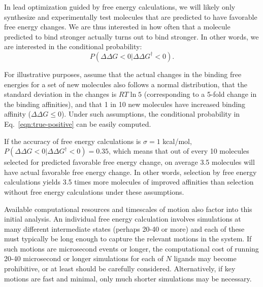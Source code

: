 \documentclass[9pt,bestpractices]{livecoms}
\begin{document}
In lead optimization guided by free energy calculations, we will likely only
synthesize and experimentally test molecules that are predicted to
have favorable free energy changes.  We are thus interested in how
often that a molecule predicted to bind stronger actually turns out to
bind stronger.  In other words, we are interested in the conditional
probability:
\begin{equation}
  P(\Delta\Delta G<0|\Delta\Delta G^\dagger<0).
  \label{eqn:true-positive}
\end{equation}

For illustrative purposes, assume that the actual changes in the
binding free energies for a set of new molecules also follows a normal
distribution, that the standard deviation in the changes is $RT\ln 5$
(corresponding to a 5-fold change in the binding affinities), and that
1 in 10 new molecules have increased binding affinity ($\Delta\Delta G
\leq 0$).  Under such assumptions, the conditional probability in
Eq.~\ref{eqn:true-positive} can be easily computed. 

If the accuracy
of free energy calculations is $\sigma = 1$ kcal/mol, $P(\Delta\Delta
G<0|\Delta\Delta G^\dagger<0) = 0.35$, which means that out of every
10 molecules selected for predicted favorable free energy change, on
average 3.5 molecules will have actual favorable free energy change.
In other words, selection by free energy calculations yields 3.5 times
more molecules of improved affinities than selection without free
energy calculations under these assumptions.
  
Available computational resources and timescales of motion also factor
into this initial analysis. An individual free energy calculation
involves simulations at many different intermediate states (perhaps
20-40 or more) and each of these must typically be long enough to
capture the relevant motions in the system. If such motions are
microsecond events or longer, the computational cost of running 20-40
microsecond or longer simulations for each of $N$ ligands may become
prohibitive, or at least should be carefully considered. Alternatively, if key motions are fast and minimal, only much shorter simulations may be necessary. 
%
\end{document}
